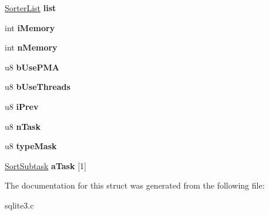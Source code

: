 \begin{DoxyCompactItemize}
\item 
\hyperlink{structSorterList}{Sorter\+List} {\bfseries list}\hypertarget{structVdbeSorter_a5e4a486d8aba4b45e3b7000d0a3b2b5b}{}\label{structVdbeSorter_a5e4a486d8aba4b45e3b7000d0a3b2b5b}

\item 
int {\bfseries i\+Memory}\hypertarget{structVdbeSorter_a32ec545e32e7b79fe8f72e15f4656786}{}\label{structVdbeSorter_a32ec545e32e7b79fe8f72e15f4656786}

\item 
int {\bfseries n\+Memory}\hypertarget{structVdbeSorter_a53740d50989018beadaff7fe814407f5}{}\label{structVdbeSorter_a53740d50989018beadaff7fe814407f5}

\item 
u8 {\bfseries b\+Use\+P\+MA}\hypertarget{structVdbeSorter_ae373cf1d1f102b34e005f0326f690bd7}{}\label{structVdbeSorter_ae373cf1d1f102b34e005f0326f690bd7}

\item 
u8 {\bfseries b\+Use\+Threads}\hypertarget{structVdbeSorter_aaf62cb4ac61aa2bcbf4ee00a2e12fe90}{}\label{structVdbeSorter_aaf62cb4ac61aa2bcbf4ee00a2e12fe90}

\item 
u8 {\bfseries i\+Prev}\hypertarget{structVdbeSorter_aa7cc8519f1b6d621de13fc383fb5478a}{}\label{structVdbeSorter_aa7cc8519f1b6d621de13fc383fb5478a}

\item 
u8 {\bfseries n\+Task}\hypertarget{structVdbeSorter_a5a6475ca0a9de4321653a4afb4fcbef0}{}\label{structVdbeSorter_a5a6475ca0a9de4321653a4afb4fcbef0}

\item 
u8 {\bfseries type\+Mask}\hypertarget{structVdbeSorter_a75a7b43b4fe86ee6348dd576b4fb1c1f}{}\label{structVdbeSorter_a75a7b43b4fe86ee6348dd576b4fb1c1f}

\item 
\hyperlink{structSortSubtask}{Sort\+Subtask} {\bfseries a\+Task} \mbox{[}1\mbox{]}\hypertarget{structVdbeSorter_abf5c3d717a20bf0ce713862f0c7b2653}{}\label{structVdbeSorter_abf5c3d717a20bf0ce713862f0c7b2653}

\end{DoxyCompactItemize}


The documentation for this struct was generated from the following file\+:\begin{DoxyCompactItemize}
\item 
sqlite3.\+c\end{DoxyCompactItemize}
